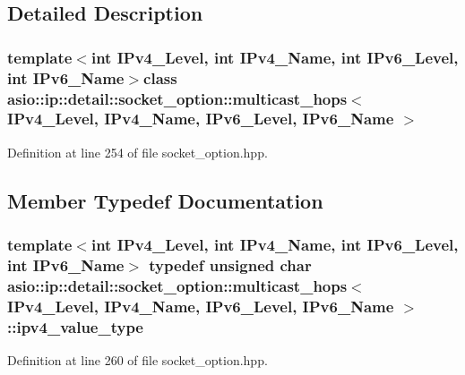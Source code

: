 \subsection{Detailed Description}
\subsubsection*{template$<$int I\+Pv4\+\_\+\+Level, int I\+Pv4\+\_\+\+Name, int I\+Pv6\+\_\+\+Level, int I\+Pv6\+\_\+\+Name$>$class asio\+::ip\+::detail\+::socket\+\_\+option\+::multicast\+\_\+hops$<$ I\+Pv4\+\_\+\+Level, I\+Pv4\+\_\+\+Name, I\+Pv6\+\_\+\+Level, I\+Pv6\+\_\+\+Name $>$}



Definition at line 254 of file socket\+\_\+option.\+hpp.



\subsection{Member Typedef Documentation}
\hypertarget{classasio_1_1ip_1_1detail_1_1socket__option_1_1multicast__hops_a0d02ef35af3a17021c1729cfed1aac37}{}
\subsubsection[{ipv4\+\_\+value\+\_\+type}]{\setlength{\rightskip}{0pt plus 5cm}template$<$int I\+Pv4\+\_\+\+Level, int I\+Pv4\+\_\+\+Name, int I\+Pv6\+\_\+\+Level, int I\+Pv6\+\_\+\+Name$>$ typedef unsigned char {\bf asio\+::ip\+::detail\+::socket\+\_\+option\+::multicast\+\_\+hops}$<$ I\+Pv4\+\_\+\+Level, I\+Pv4\+\_\+\+Name, I\+Pv6\+\_\+\+Level, I\+Pv6\+\_\+\+Name $>$\+::{\bf ipv4\+\_\+value\+\_\+type}}\label{classasio_1_1ip_1_1detail_1_1socket__option_1_1multicast__hops_a0d02ef35af3a17021c1729cfed1aac37}


Definition at line 260 of file socket\+\_\+option.\+hpp.

\hypertarget{classasio_1_1ip_1_1detail_1_1socket__option_1_1multicast__hops_a186549302284820cb23ca9271e45f371}{}
